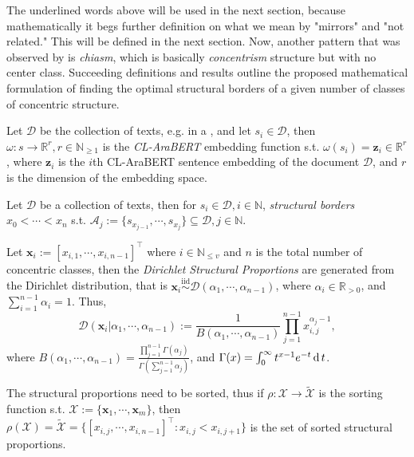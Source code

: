 The underlined words above will be used in the next section, because mathematically it begs further definition on what we mean by "mirrors" and "not related." This will be defined in the next section. Now, another pattern that was observed by  is \textit{chiasm}, which is basically \textit{concentrism} structure but with no center class. Succeeding definitions and results outline the proposed mathematical formulation of finding the optimal structural borders of a given number of classes of concentric structure.
\begin{defn}
    Let $\mathscr{D}$ be the collection of texts, e.g.   in a  , and let $s_i\in\mathscr{D}$, then  $\omega:s\rightarrow\mathbb{R}^{r},r\in\mathbb{N}_{\geq 1}$ is the \textit{CL-AraBERT} embedding function s.t. $\omega(s_i)=\mathbf{z}_i\in\mathbb{R}^{r}$, where $\mathbf{z}_i$ is the $i$th CL-AraBERT sentence embedding of the document $\mathscr{D}$, and $r$ is the dimension of the embedding space. 
\end{defn}
\begin{defn}\label{defn:structural_borders}
    Let $\mathscr{D}$ be a collection of texts, then for $s_i\in\mathscr{D}, i\in\mathbb{N}$, \exists\; \textit{structural borders} $x_0<\cdots<x_{n}$ s.t. $\mathscr{A}_j:=\{s_{x_{j-1}},\cdots,s_{x_{j}}\}\subseteq\mathscr{D},j\in\mathbb{N}$.
\end{defn}
\begin{defn}\label{defn:dirichlet_structural_proportions}
    Let $\mathbf{x}_i:=[x_{i,1},\cdots,x_{i,n-1}]^{\top}$ where $i\in\mathbb{N}_{\leq v}$ and $n$ is the total number of concentric classes, then the \textit{Dirichlet Structural Proportions} are generated from the Dirichlet distribution, that is $\mathbf{x}_i\overset{\text{iid}}{\sim}\mathcal{D}(\alpha_1,\cdots,\alpha_{n-1})$, where $\alpha_i\in\mathbb{R}_{>0}$, and $\sum_{i=1}^{n-1}\alpha_i=1$. Thus,
    \begin{equation}
        \mathcal{D}(\mathbf{x}_i|\alpha_1,\cdots,\alpha_{n-1}):=\frac{1}{B(\alpha_1,\cdots,\alpha_{n-1})}\prod_{j=1}^{n-1}x_{i,j}^{\alpha_j-1},
    \end{equation}
    where $B(\alpha_1,\cdots,\alpha_{n-1})=\frac{\prod_{j=1}^{n-1}\Gamma(\alpha_j)}{\Gamma(\sum_{j=1}^{n-1}\alpha_j)}$, and $\Gamma(x)=\int_0^{\infty}t^{x-1}e^{-t}\operatorname{d} t$.
\end{defn}
\begin{remark}
    The structural proportions need to be sorted, thus if $\rho:\mathscr{X}\rightarrow\tilde{\mathscr{X}}$ is the sorting function s.t. $\mathscr{X}:=\{\mathbf{x}_1,\cdots,\mathbf{x}_m\}$, then $\rho(\mathscr{X})=\tilde{\mathscr{X}}=\{[x_{i,j},\cdots,x_{i,n-1}]^{\top}:x_{i,j}<x_{i,j+1}\}$ is the set of sorted structural proportions.
\end{remark}

